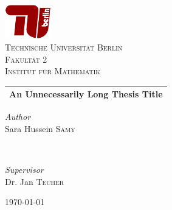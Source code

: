 \documentclass[12pt,a4paper]{article}
\begin{document}
\begin{titlepage}
\newcommand{\HRule}{\rule{\linewidth}{0.5mm}}
\begin{center}

\includegraphics[width=0.15\textwidth]{TU-Berlin-Logo.png}\\[1cm]
\textsc{\LARGE Technische Universität Berlin}\\[1.5cm]
\textsc{\large Fakultät 2}\\[0.5cm]
\textsc{\large Institut für Mathematik}\\[0.5cm]

\setlength{\aboverulesep}{10pt}
\setlength{\belowrulesep}{13pt}
\begin{tabularx}{\textwidth}{ >{\centering\arraybackslash}X}
\midrule[0.5mm]
\huge\bfseries An Unnecessarily Long Thesis Title\\
\midrule[0.5mm]
\end{tabularx}

\begin{minipage}{0.4\textwidth}
    \begin{flushleft}
        \large
        \textit{Author}\\
        Sara Hussein \textsc{Samy}
    \end{flushleft}
\end{minipage}
~
\begin{minipage}{0.4\textwidth}
    \begin{flushright}
        \large
        \textit{Supervisor}\\
        Dr. Jan \textsc{Techer}
    \end{flushright}
\end{minipage}

\vspace{260 pt}
{\large\today}
\end{center}
\end{titlepage}


\renewcommand{\contentsname}{Table of contents}
\tableofcontents
\pagebreak
\end{document}
